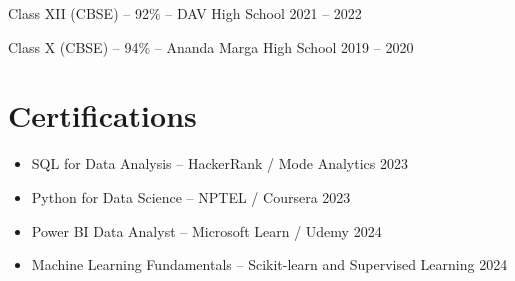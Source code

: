 \documentclass{article}
\begin{document}
Class XII (CBSE) -- 92\% -- DAV High School \hfill 2021 -- 2022

Class X (CBSE) -- 94\% -- Ananda Marga High School \hfill 2019 -- 2020

\vspace{4pt}

\section*{Certifications}
\begin{itemize}
    \item SQL for Data Analysis -- HackerRank / Mode Analytics \hfill 2023
    \item Python for Data Science -- NPTEL / Coursera \hfill 2023
    \item Power BI Data Analyst -- Microsoft Learn / Udemy \hfill 2024
    \item Machine Learning Fundamentals -- Scikit-learn and Supervised Learning \hfill 2024
\end{itemize}
\end{document}
